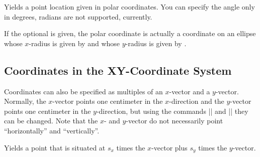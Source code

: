 \begin{command}{\pgfpointpolar{}}
    Yields a point location given in polar coordinates. You can specify the
    angle only in degrees, radians are not supported, currently.

    If the optional  is given, the polar coordinate is actually
    a coordinate on an ellipse whose $x$-radius is given by  and
    whose $y$-radius is given by .
\begin{codeexample}[]
\end{codeexample}
\begin{codeexample}[]
\end{codeexample}
\end{command}


\subsection{Coordinates in the XY-Coordinate System}

Coordinates can also be specified as multiples of an $x$-vector and a
$y$-vector. Normally, the $x$-vector points one centimeter in the $x$-direction
and the $y$-vector points one centimeter in the $y$-direction, but using the
commands |\pgfsetxvec| and |\pgfsetyvec| they can be changed. Note that the
$x$- and $y$-vector do not necessarily point ``horizontally'' and
``vertically''.

\begin{command}{\pgfpointxy{}}
    Yields a point that is situated at $s_x$ times the $x$-vector plus $s_y$
    times the $y$-vector.
\begin{codeexample}[]
\end{codeexample}
\end{command}

